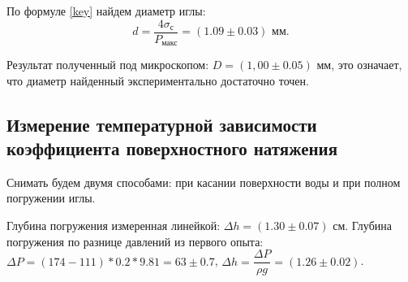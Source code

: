 \documentclass[a4paper,12pt]{article}
\theoremstyle{definition}
\begin{document}
	По формуле \eqref{key} найдем диаметр иглы:
	\begin{equation*}
		d = \frac{4\sigma_{\text{с}}}{P_\text{макс}} = (1.09\pm 0.03)\text{ мм}.
	\end{equation*}

	Результат полученный под микроскопом: $D = (1,00\pm0.05)$ мм, это означает, что диаметр найденный экспериментально достаточно точен.
	
	\subsection{Измерение температурной зависимости коэффициента поверхностного натяжения}
	
	Снимать будем двумя способами: при касании поверхности воды и при полном погружении иглы.
	
	Глубина погружения измеренная линейкой: $\Delta h = (1.30\pm0.07)$ см. Глубина погружения по разнице давлений из первого опыта: $\Delta P = (174-111)*0.2*9.81 = 63\pm0.7$, $\Delta h = \dfrac{\Delta P}{\rho g} = (1.26\pm0.02)$.
	
\end{document}
